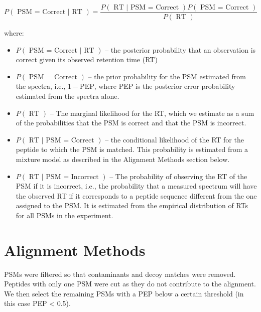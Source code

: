 \begin{spacing}{1.55}
\[ P(\mbox{ PSM = Correct }|\mbox{ RT }) = \frac{P(\mbox{ RT }|\mbox{ PSM = Correct })P(\mbox{ PSM = Correct })}{P(\mbox{ RT })} \]

where:

\begin{itemize}
\item $P(\mbox{ PSM = Correct }|\mbox{ RT })$ -- the posterior probability that an observation is correct given its observed retention time (RT)

\item $P(\mbox{ PSM = Correct })$ -- the prior probability for the PSM estimated from the spectra, i.e., $1- \mbox{PEP}$, where PEP is the posterior error probability estimated from the spectra alone. 
\item $P(\mbox{ RT })$ -- The marginal likelihood for the RT, which we estimate as a sum of the probabilities that the PSM is correct and that the PSM is incorrect. 

%
\item $P(\mbox{ RT }|\mbox{ PSM = Correct })$ -- the conditional likelihood of the RT for the peptide to which the PSM is matched. This probability is estimated from a mixture model as described in the Alignment Methods section below.

\item $P(\mbox{ RT }|\mbox{ PSM = Incorrect })$ -- The probability of observing the RT of the PSM if it is incorrect, i.e., the probability that a measured spectrum will have the observed RT if it corresponds to a peptide sequence different from the one assigned to the PSM. It is estimated from the empirical distribution of RTs for all PSMs in the experiment.

\end{itemize}



\section{Alignment Methods}

PSMs were filtered so that contaminants and decoy matches were removed. Peptides with only one PSM were cut as they do not contribute to the alignment. We then select the remaining PSMs with a PEP below a certain threshold (in this case PEP < 0.5).


\end{spacing}
